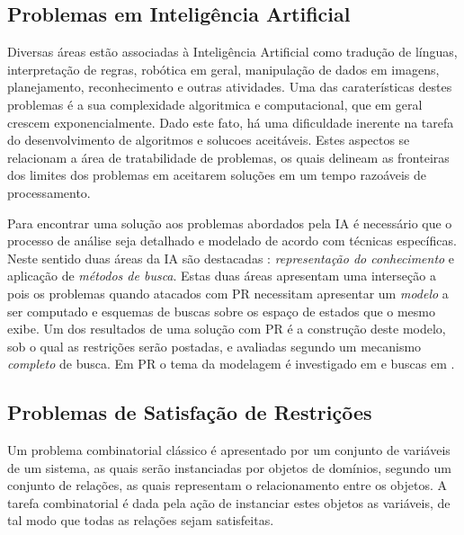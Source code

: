 \subsection{Problemas em Inteligência Artificial}

Diversas áreas estão associadas à Inteligência Artificial como tradução de línguas, interpretação de regras, robótica em geral,  manipulação de dados em imagens,
 planejamento, reconhecimento  e outras atividades. Uma das caraterísticas destes problemas 
é a sua complexidade algoritmica e computacional, que em geral crescem exponencialmente.
Dado este fato, há uma dificuldade inerente na tarefa do desenvolvimento de algoritmos
 e solucoes aceitáveis. Estes aspectos se relacionam a área de tratabilidade de problemas,
 os quais delineam as fronteiras dos limites dos problemas em aceitarem
 soluções em um tempo razoáveis de processamento.


Para encontrar uma solução  aos problemas abordados pela IA é necessário que o processo de análise seja detalhado e modelado de 
acordo com técnicas específicas. Neste sentido duas áreas da IA são destacadas \cite{RusNorv2010}: \textit{representação do 
conhecimento}  e aplicação de \textit{métodos de busca}. Estas duas áreas apresentam uma interseção a \PR  pois os problemas quando 
atacados com PR necessitam apresentar um \textit{modelo} a ser computado e esquemas
de buscas sobre os espaço de estados que o mesmo exibe. Um dos  resultados
de uma solução com PR é a construção deste modelo, sob o qual as restrições serão
postadas, e avaliadas segundo um mecanismo \textit{completo} de busca.
 Em PR o tema da modelagem 
é investigado em \cite{smith_2006} e buscas em \cite{beek_2006,hoos_2006}.



\subsection{Problemas de Satisfação de Restrições}
\label{sec:ch_cp}

Um problema combinatorial cl\'assico é apresentado por um conjunto de vari\'aveis de um sistema,  as quais  ser\~ao instanciadas por objetos de domínios, segundo um conjunto de relaç\~oes, as quais representam o relacionamento entre os objetos. A tarefa combinatorial
é dada pela aç\~ao de instanciar estes objetos as variáveis, de tal modo que todas as 
relaç\~oes sejam satisfeitas.

